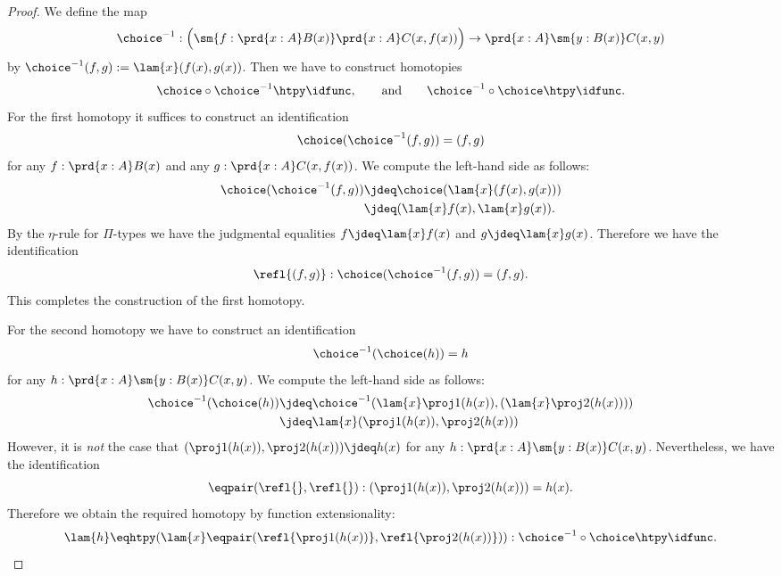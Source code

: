 \begin{proof}
  We define the map
  \begin{equation*}
    \choice^{-1}:\Big(\sm{f:\prd{x:A}B(x)}\prd{x:A}C(x,f(x))\Big)\to \prd{x:A}\sm{y:B(x)}C(x,y)
  \end{equation*}
  by $\choice^{-1}(f,g):=\lam{x}(f(x),g(x))$. Then we have to construct homotopies
  \begin{equation*}
    \choice\circ\choice^{-1}\htpy\idfunc,\qquad\text{and}\qquad
    \choice^{-1}\circ\choice\htpy\idfunc.
  \end{equation*}
  For the first homotopy it suffices to construct an identification
  \begin{equation*}
    \choice(\choice^{-1}(f,g))=(f,g)
  \end{equation*}
  for any $f:\prd{x:A}B(x)$ and any $g:\prd{x:A}C(x,f(x))$. We compute the left-hand side as follows:
  \begin{align*}
    \choice(\choice^{-1}(f,g))
    & \jdeq \choice(\lam{x}(f(x),g(x))) \\
    & \jdeq (\lam{x}f(x),\lam{x}g(x)).
  \end{align*}
  By the $\eta$-rule for $\Pi$-types we have the judgmental equalities $f\jdeq \lam{x}f(x)$ and $g\jdeq\lam{x}g(x)$. Therefore we have the identification
  \begin{equation*}
    \refl{(f,g)}:\choice(\choice^{-1}(f,g))=(f,g).
  \end{equation*}
  This completes the construction of the first homotopy.

  For the second homotopy we have to construct an identification
  \begin{equation*}
    \choice^{-1}(\choice(h))=h
  \end{equation*}
  for any $h:\prd{x:A}\sm{y:B(x)}C(x,y)$. We compute the left-hand side as follows:
  \begin{align*}
    \choice^{-1}(\choice(h))
    & \jdeq \choice^{-1}(\lam{x}\proj 1(h(x)),(\lam{x}\proj 2(h(x)))) \\
    & \jdeq \lam{x}(\proj 1(h(x)),\proj 2(h(x)))
  \end{align*}
  However, it is \emph{not} the case that $(\proj 1(h(x)),\proj 2(h(x)))\jdeq h(x)$ for any $h:\prd{x:A}\sm{y:B(x)}C(x,y)$. Nevertheless, we have the identification
  \begin{equation*}
    \eqpair(\refl{},\refl{}):(\proj 1(h(x)),\proj 2(h(x)))= h(x).
  \end{equation*}
  Therefore we obtain the required homotopy by function extensionality:
  \begin{equation*}
    \lam{h}\eqhtpy(\lam{x}\eqpair(\refl{\proj 1(h(x))},\refl{\proj 2(h(x))})):\choice^{-1}\circ\choice\htpy\idfunc.\qedhere
  \end{equation*}
\end{proof}


